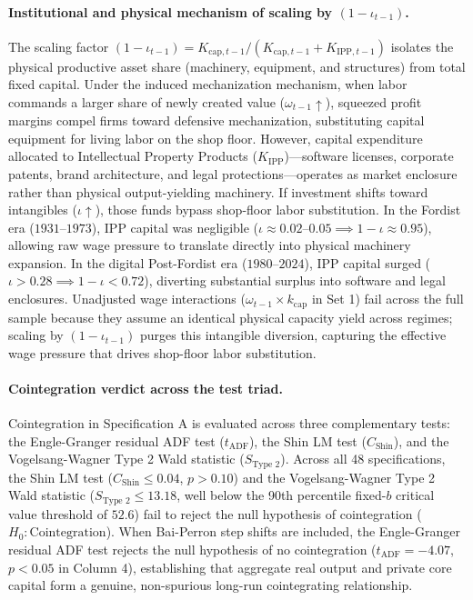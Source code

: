 \paragraph{Institutional and physical mechanism of scaling by $(1-\iota_{t-1})$.}
The scaling factor $(1-\iota_{t-1}) = K_{\text{cap},t-1} / (K_{\text{cap},t-1} + K_{\text{IPP},t-1})$ isolates the physical productive asset share (machinery, equipment, and structures) from total fixed capital. Under the induced mechanization mechanism, when labor commands a larger share of newly created value ($\omega_{t-1} \uparrow$), squeezed profit margins compel firms toward defensive mechanization, substituting capital equipment for living labor on the shop floor. However, capital expenditure allocated to Intellectual Property Products ($K_{\text{IPP}}$)---software licenses, corporate patents, brand architecture, and legal protections---operates as market enclosure rather than physical output-yielding machinery. If investment shifts toward intangibles ($\iota \uparrow$), those funds bypass shop-floor labor substitution. In the Fordist era ($1931$--$1973$), IPP capital was negligible ($\iota \approx 0.02$--$0.05 \implies 1-\iota \approx 0.95$), allowing raw wage pressure to translate directly into physical machinery expansion. In the digital Post-Fordist era ($1980$--$2024$), IPP capital surged ($\iota > 0.28 \implies 1-\iota < 0.72$), diverting substantial surplus into software and legal enclosures. Unadjusted wage interactions ($\omega_{t-1} \times k_{\text{cap}}$ in Set 1) fail across the full sample because they assume an identical physical capacity yield across regimes; scaling by $(1-\iota_{t-1})$ purges this intangible diversion, capturing the effective wage pressure that drives shop-floor labor substitution.

\paragraph{Cointegration verdict across the test triad.}
Cointegration in Specification A is evaluated across three complementary tests: the Engle-Granger residual ADF test ($t_{\text{ADF}}$), the Shin \citeyearpar{Shin1994} LM test ($C_{\text{Shin}}$), and the Vogelsang-Wagner Type 2 Wald statistic ($S_{\text{Type 2}}$). Across all 48 specifications, the Shin LM test ($C_{\text{Shin}} \le 0.04$, $p > 0.10$) and the Vogelsang-Wagner Type 2 Wald statistic ($S_{\text{Type 2}} \le 13.18$, well below the 90th percentile fixed-$b$ critical value threshold of $52.6$) fail to reject the null hypothesis of cointegration ($H_0: \text{Cointegration}$). When Bai-Perron step shifts are included, the Engle-Granger residual ADF test rejects the null hypothesis of no cointegration ($t_{\text{ADF}} = -4.07$, $p < 0.05$ in Column 4), establishing that aggregate real output and private core capital form a genuine, non-spurious long-run cointegrating relationship.

